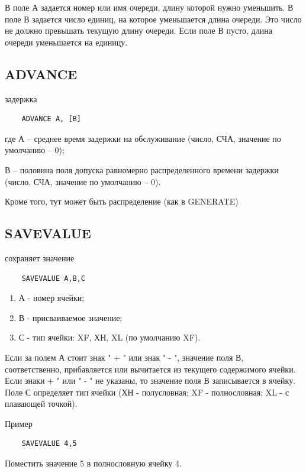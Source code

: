 \documentclass[14pt]{extarticle}
\begin{document}
В поле А задается номер или имя очереди, длину которой нужно уменьшить. В поле В задается число единиц, на которое уменьшается длина очереди. Это число не должно превышать текущую длину очереди. Если поле В пусто, длина очереди уменьшается на единицу.

\subsection*{ADVANCE}

задержка

\begin{lstlisting}
	ADVANCE A, [B]
\end{lstlisting}

где А – среднее время задержки на обслуживание (число, СЧА, значение по умолчанию – 0);

В – половина поля допуска равномерно распре­деленного времени задержки (число, СЧА, значение по умолчанию – 0).

Кроме того, тут может быть распределение (как в GENERATE)

\subsection*{SAVEVALUE}

сохраняет значение

\begin{lstlisting}
	SAVEVALUE A,B,C
\end{lstlisting}

\begin{enumerate}
	\item А - номер ячейки;
	\item В - присваиваемое значение;
	\item С - тип ячейки: XF, ХН, XL (по умолчанию XF).
\end{enumerate}

Если за полем А стоит знак " + " или знак " - ", значение поля В, соответственно, прибавляется или вычитается из текущего содержимого ячейки. Если знаки + " или " - " не указаны, то значение поля В записывается в ячейку. Поле С определяет тип ячейки (ХН - полусловная; XF - полнословная; XL - с плавающей точкой).


Пример

\begin{lstlisting}
	SAVEVALUE 4,5
\end{lstlisting}

Поместить значение 5 в полнословную ячейку 4.
\end{document}
